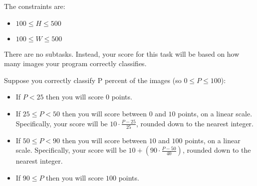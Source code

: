 The constraints are:
\begin{itemize}
\item $100 \leq H \leq 500$
\item $100 \leq W \leq 500$
\end{itemize}
There are no subtasks. Instead, your score for this task will be based on how many images your program correctly classifies.

Suppose you correctly classify P percent of the images (so $0 \leq P \leq 100$):
\begin{itemize}
\item If $P < 25$ then you will score $0$ points.
\item If $25 \leq P < 50$ then you will score between $0$ and $10$ points, on a linear scale. Specifically, your score will be $10 \cdot \frac{P -­ 25}{25}$, rounded down to the nearest integer.
\item If $50 \leq P < 90$ then you will score between $10$ and $100$ points, on a linear scale. Specifically, your score will be $10 + \left(90 \cdot \frac{P -­ 50}{40}\right)$, rounded down to the nearest integer.
\item If $90 \leq P$ then you will score $100$ points.
\end{itemize}
